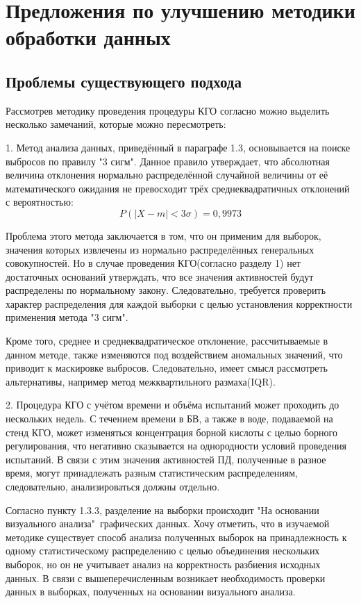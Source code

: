 \section{Предложения по улучшению методики обработки данных}

\subsection{Проблемы существующего подхода}
Рассмотрев методику проведения процедуры КГО согласно\cite{RD} можно выделить несколько замечаний, которые можно пересмотреть:

1. Метод анализа данных, приведённый в параграфе 1.3, основывается на поиске выбросов по правилу "3 сигм". Данное правило утверждает, что  абсолютная величина отклонения нормально распределённой случайной величины от её математического ожидания не превосходит трёх среднеквадратичных отклонений с вероятностью\cite{KremerMatstat}:
\begin{equation} \label{eq:3sigma_rule}
	P(|X - m| < 3\sigma)  = 0,9973
\end{equation}

Проблема этого метода заключается в том, что он применим для выборок, значения которых извлечены из нормально распределённых генеральных совокупностей. Но в случае проведения КГО(согласно разделу 1) нет достаточных оснований утверждать, что все значения активностей будут распределены по нормальному закону. Следовательно, требуется проверить характер распределения для каждой выборки с целью установления корректности применения метода "3 сигм".

Кроме того, среднее и среднеквадратическое отклонение, рассчитываемые в данном методе, также изменяются под воздействием аномальных значений, что приводит к маскировке выбросов\cite{emissions}. Следовательно, имеет смысл рассмотреть альтернативы, например метод межквартильного размаха(IQR).

2. Процедура КГО с учётом времени и объёма испытаний может проходить до нескольких недель. С течением времени в БВ, а также в воде, подаваемой на стенд КГО, может изменяться концентрация борной кислоты с целью борного регулирования, что негативно сказывается на однородности условий проведения испытаний. В связи с этим значения активностей ПД, полученные в разное время, могут принадлежать разным статистическим распределениям, следовательно, анализироваться должны отдельно. 

Согласно пункту 1.3.3, разделение на выборки происходит "На основании визуального анализа"\ графических данных. Хочу отметить, что в изучаемой методике существует способ анализа полученных выборок на принадлежность к одному статистическому распределению с целью объединения нескольких выборок, но он не учитывает анализ на корректность разбиения исходных данных. В связи с вышеперечисленным возникает необходимость проверки данных в выборках, полученных на основании визуального анализа.

